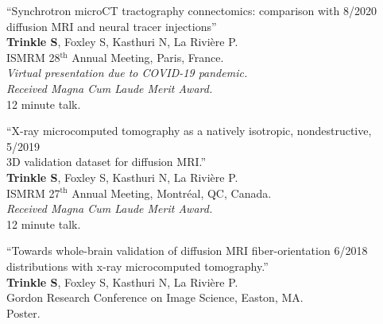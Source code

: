 \documentclass[10pt,letterpaper]{article}
\begin{document}
\nocite{*}
\setlength{}
\printbibliography[heading=none, type=article, sorting=ynt]

\begin{etaremune}[labelsep=0.035\textwidth]

\item{``Synchrotron microCT tractography connectomics: comparison with \hfill 8/2020\\ diffusion MRI and neural tracer injections''\\
    \textbf{Trinkle S}, Foxley S, Kasthuri N, La Rivière P.\\
    ISMRM 28$^{\text{th}}$ Annual Meeting, Paris, France.\\
    \textit{Virtual presentation due to COVID-19 pandemic.}\\
    \textit{Received Magna Cum Laude Merit Award.}\\
    12 minute talk.}

\item{``X-ray microcomputed tomography as a natively isotropic, nondestructive, \hfill 5/2019\\
    3D validation dataset for diffusion MRI.''\\
    \textbf{Trinkle S}, Foxley S, Kasthuri N, La Rivière P.\\
    ISMRM 27$^{\text{th}}$ Annual Meeting, Montr\'eal, QC, Canada.\\
    \textit{Received Magna Cum Laude Merit Award.}\\
    12 minute talk.}
  
\item{``Towards whole-brain validation of diffusion MRI fiber-orientation \hfill 6/2018\\
    distributions with x-ray microcomputed tomography.''\\
    \textbf{Trinkle S}, Foxley S, Kasthuri N, La Rivière P.\\
    Gordon Research Conference on Image Science, Easton, MA. \\
    Poster.}


\end{etaremune}
\end{document}
